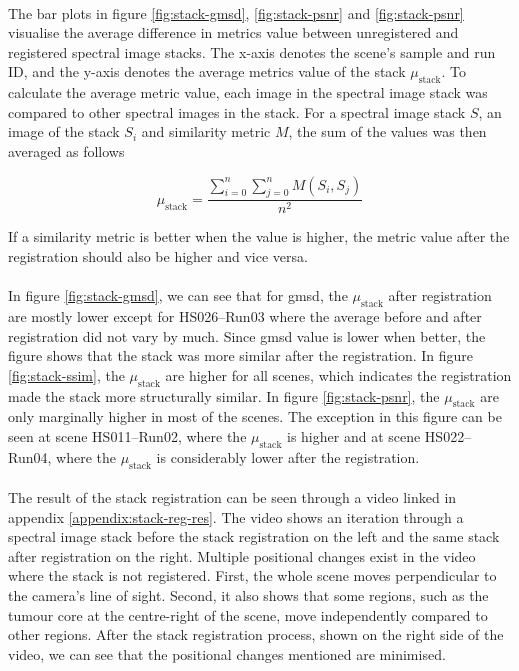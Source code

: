 \documentclass[12pt,oneside]{report}
\begin{document}
\paragraph{}
The bar plots in figure \ref{fig:stack-gmsd}, \ref{fig:stack-psnr} and \ref{fig:stack-psnr} visualise the average difference in metrics value between unregistered and registered spectral image stacks. The x-axis denotes the scene's sample and run ID, and the y-axis denotes the average metrics value of the stack $\mu_{\text{stack}}$. To calculate the average metric value, each image in the spectral image stack was compared to other spectral images in the stack. For a spectral image stack $S$, an image of the stack $S_i$ and similarity metric $M$, the sum of the values was then averaged as follows

\begin{equation}
    \mu_{\text{stack}} =
    \frac
    {\sum\limits_{i=0}^n\sum\limits_{j=0}^n M(S_i, S_j)}
    {n^2}
\end{equation}

If a similarity metric is better when the value is higher, the metric value after the registration should also be higher and vice versa.

\paragraph{}
In figure \ref{fig:stack-gmsd}, we can see that for \acrshort{gmsd}, the $\mu_{\text{stack}}$ after registration are mostly lower except for HS026--Run03 where the average before and after registration did not vary by much. Since \acrshort{gmsd} value is lower when better, the figure shows that the stack was more similar after the registration. In figure \ref{fig:stack-ssim}, the $\mu_{\text{stack}}$ are higher for all scenes, which indicates the registration made the stack more structurally similar. In figure \ref{fig:stack-psnr}, the $\mu_{\text{stack}}$ are only marginally higher in most of the scenes. The exception in this figure can be seen at scene HS011--Run02, where the $\mu_{\text{stack}}$ is higher and at scene HS022--Run04, where the $\mu_{\text{stack}}$ is considerably lower after the registration.

\paragraph{}
The result of the stack registration can be seen through a video linked in appendix \ref{appendix:stack-reg-res}. The video shows an iteration through a spectral image stack before the stack registration on the left and the same stack after registration on the right. Multiple positional changes exist in the video where the stack is not registered. First, the whole scene moves perpendicular to the camera's line of sight. Second, it also shows that some regions, such as the tumour core at the centre-right of the scene, move independently compared to other regions. After the stack registration process, shown on the right side of the video, we can see that the positional changes mentioned are minimised.
\end{document}
